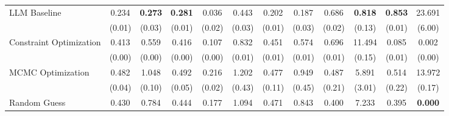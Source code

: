 \begin{table}[ht]
{\begin{tabular}{l cccc cccc cc c}
            \addlinespace[0.2em]
            LLM Baseline            & 0.234                                           & \textbf{0.273  }                             & \textbf{0.281  }                              & 0.036                   & 0.443            & 0.202           & 0.187             & 0.686           & \textbf{0.818 } & \textbf{0.853 } & 23.691            \\
                                    & (0.01)                                          & (0.03)                                       & (0.01)                                        & (0.02)                  & (0.03)           & (0.01)          & (0.03)            & (0.02)          & (0.13)          & (0.01)          & (6.00)            \\
            \addlinespace[0.2em]
            Constraint Optimization & 0.413                                           & 0.559                                        & 0.416                                         & 0.107                   & 0.832            & 0.451           & 0.574             & 0.696           & 11.494          & 0.085           & 0.002             \\
                                    & (0.00)                                          & (0.00)                                       & (0.00)                                        & (0.00)                  & (0.01)           & (0.01)          & (0.01)            & (0.01)          & (0.15)          & (0.01)          & (0.00)            \\
            \addlinespace[0.2em]
            MCMC Optimization       & 0.482                                           & 1.048                                        & 0.492                                         & 0.216                   & 1.202            & 0.477           & 0.949             & 0.487           & 5.891           & 0.514           & 13.972            \\
                                    & (0.04)                                          & (0.10)                                       & (0.05)                                        & (0.02)                  & (0.43)           & (0.11)          & (0.45)            & (0.21)          & (3.01)          & (0.22)          & (0.17)            \\
            \addlinespace[0.2em]
            Random Guess            & 0.430                                           & 0.784                                        & 0.444                                         & 0.177                   & 1.094            & 0.471           & 0.843             & 0.400           & 7.233           & 0.395           & \textbf{0.000}    \\

\end{tabular}}
\end{table}
